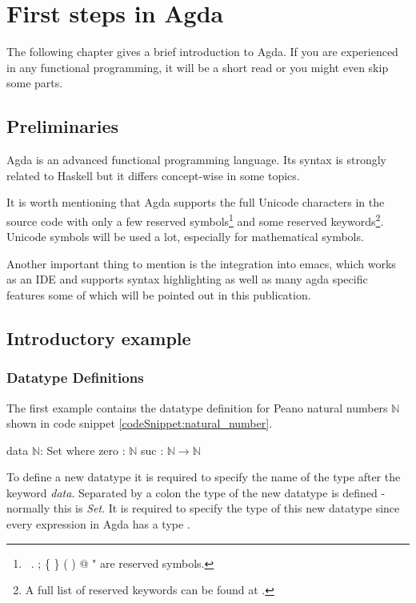 \section{First steps in Agda}\label{section:first_steps_in_agda}
The following chapter gives a brief introduction to Agda. If you are experienced in any functional programming, it will be a short read or you might even skip some parts.

\subsection{Preliminaries}
Agda is an advanced functional programming language. Its syntax is strongly related to Haskell but it differs concept-wise in some topics. 

It is worth mentioning that Agda supports the full Unicode characters in the source code with only a few reserved symbols\footnote{\, . ; \{ \} ( ) @ " are reserved symbols\cite{AgdaReadTheDocsStructure}.} 
and some reserved keywords\footnote{A full list of reserved keywords can be found at \cite{AgdaReadTheDocsStructure}.}. 
Unicode symbols will be used a lot, especially for mathematical symbols.

Another important thing to mention is the integration into emacs, which works as an IDE and supports syntax highlighting as well as many agda specific features some of which will be pointed out in this publication.

\subsection{Introductory example}\label{section:agda_introduction_example}
\subsubsection{Datatype Definitions}
The first example contains the datatype definition for Peano natural numbers $\mathbb{N}$ shown in code snippet \ref{codeSnippet:natural_number}.

\begin{codesnippet}[mathescape=true, caption={Peano numbers datatype}, label={codeSnippet:natural_number}]
data $\mathbb{N}$: Set where
  zero : $\mathbb{N}$
  suc  : $\mathbb{N} \rightarrow \mathbb{N}$
\end{codesnippet}

To define a new datatype it is required to specify the name of the type after the keyword \emph{data}.
Separated by a colon the type of the new datatype is defined - normally this is \emph{Set}.
It is required to specify the type of this new datatype since  every expression in Agda has a type \cite{10.1145/2841316}.

